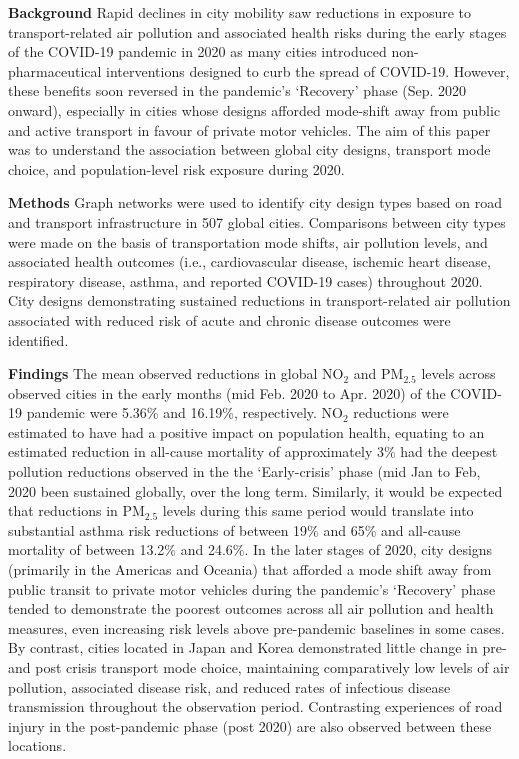 \documentclass[preprint,10pt]{elsarticle} %
\newcommand{\absdiv}[1]{%
  \par\addvspace{.5\baselineskip}%
  \noindent\textbf{#1}\quad\ignorespaces}
\begin{document}


 \absdiv{\textcolor{OliveGreen}{Background}}
Rapid declines in city mobility saw reductions in exposure to transport-related air pollution and associated health risks during the early stages of the COVID-19 pandemic in 2020 as many cities introduced non-pharmaceutical interventions designed to curb the spread of COVID-19. However, these benefits soon reversed in the pandemic's `Recovery' phase (Sep. 2020 onward), especially in cities whose designs afforded mode-shift away from public and active transport in favour of private motor vehicles. The aim of this paper was to understand the association between global city designs, transport mode choice, and population-level risk exposure during 2020.
 \absdiv{\textcolor{OliveGreen}{Methods}}
Graph networks were used to identify city design types based on road and transport infrastructure in 507 global cities. Comparisons between city types were made on the basis of transportation mode shifts, air pollution levels, and associated health outcomes (i.e., cardiovascular disease, ischemic heart disease, respiratory disease, asthma, and reported COVID-19 cases) throughout 2020. City designs demonstrating sustained reductions in transport-related air pollution associated with reduced risk of acute and chronic disease outcomes were identified.
 \absdiv{\textcolor{OliveGreen}{Findings}}
The mean observed reductions in global NO$_{2}$ and PM$_{2.5}$ levels across observed cities in the early months (mid Feb. 2020 to Apr. 2020) of the COVID-19 pandemic were 5.36\% and 16.19\%, respectively. NO$_{2}$ reductions were estimated to have had a positive impact on population health, equating to an estimated reduction in all-cause mortality of approximately 3\% had the deepest pollution reductions observed in the the `Early-crisis' phase (mid Jan to Feb, 2020 been sustained globally, over the long term. Similarly, it would be expected that reductions in PM$_{2.5}$ levels during this same period would translate into substantial asthma risk reductions of between 19\% and 65\% and all-cause mortality of between 13.2\% and 24.6\%. In the later stages of 2020, city designs (primarily in the Americas and Oceania) that afforded a mode shift away from public transit to private motor vehicles during the pandemic's `Recovery' phase tended to demonstrate the poorest outcomes across all air pollution and health measures, even increasing risk levels above pre-pandemic baselines in some cases. By contrast, cities located in Japan and Korea demonstrated little change in pre- and post crisis transport mode choice, maintaining comparatively low levels of air pollution, associated disease risk, and reduced rates of infectious disease transmission throughout the observation period. Contrasting experiences of road injury in the post-pandemic phase (post 2020) are also observed between these locations.
\end{document}

